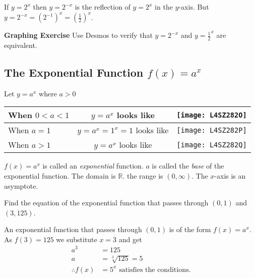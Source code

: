 If $y =2^{x}$ then $y =2^{ -x}$ is the reflection of $y =2^{x}$ in the $y$-axis. But $y =2^{ -x} =\left (2^{ -1}\right )^{x} =\genfrac{(}{)}{}{}{1}{2}^{x}$. 

\textbf{Graphing Exercise} Use Desmos to verify that $y =2^{-x}$ and $y =\frac{1}{2}^x$ are equivalent. 

\subsection*{The Exponential Function $f(x)=a^x$}
Let $y =a^{x}$ where $a >0$ 

\begin{center}
\begin{tabular}{lcl}
	\toprule
	When $0 <a <1$  & $y =a^{x}$ looks like  &    
	\texttt{[image: L4SZ282O]}
	\\
	\midrule
	When $a =1$  & $y =a^{x} =1^{x} =1$ looks like  &    
	\texttt{[image: L4SZ282P]}
	\\
	\midrule
	When $a >1$  & $y =a^{x}$ looks like  &    
\texttt{[image: L4SZ282Q]}
	\\
	\bottomrule
\end{tabular}
\end{center}

$f (x) =a^{x}$ is called an \emph{exponential} function. $a$ is called the \emph{base} of the exponential function. The domain
is $\mathbb{R}$. the range is $\left (0 ,\infty \right )$. The $x$-axis is an asymptote. 

\example Find the equation of the exponential function that passes through $\left (0 ,1\right )$ and $\left (3 ,125\right )$. 

\solution An exponential function that passes through $\left (0 ,1\right )$ is of the form $f (x) =a^{x}$. As $f (3) =125$ we substitute $x =3$ and get
\begin{align*}a^{3} &  = 125 \\
a &  = \sqrt[{3}]{125} =5\\
\therefore f(x)&=5^x \text{ satisfies the conditions.}
\end{align*}

